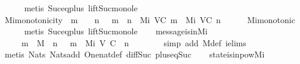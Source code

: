 \begin{isabellebody}
\ \ \ \ \isamarkupfalse%
\ {\isacharparenleft}metis\ Suc{\isacharunderscore}eq{\isacharunderscore}plus{}\ lift{\isacharunderscore}Suc{\isacharunderscore}mono{\isacharunderscore}le{\isacharparenright}%
\endisatagproof
{\isafoldproof}%
%
\isadelimproof
\isanewline
%
\endisadelimproof
\isanewline
\ \ \isamarkupfalse%
\ Mi{\isacharunderscore}monotonicity{\isacharcolon}\ {\isachardoublequoteopen}{\isasymforall}\ m\ {\isasymin}\ {\isasymnat}{\isachardot}\ {\isasymforall}\ n\ {\isasymin}\ {\isasymnat}{\isachardot}\ m\ {\isasymle}\ n\ {\isasymlongrightarrow}\ Mi\ {\isacharparenleft}V{\isacharcomma}C{\isacharcomma}{\isasymepsilon}{\isacharparenright}\ m\ {\isasymsubseteq}\ Mi\ {\isacharparenleft}V{\isacharcomma}C{\isacharcomma}{\isasymepsilon}{\isacharparenright}\ n{\isachardoublequoteclose}\isanewline
%
\isadelimproof
\ \ \ \ %
\endisadelimproof
%
\isatagproof
{}\isamarkupfalse%
\ Mi{\isacharunderscore}monotonic\isanewline
\ \ \ \ \isamarkupfalse%
\ {\isacharparenleft}metis\ Suc{\isacharunderscore}eq{\isacharunderscore}plus{}\ lift{\isacharunderscore}Suc{\isacharunderscore}mono{\isacharunderscore}le{\isacharparenright}%
\endisatagproof
{\isafoldproof}%
%
\isadelimproof
\isanewline
%
\endisadelimproof
\isanewline
\ \ \isamarkupfalse%
\ message{\isacharunderscore}is{\isacharunderscore}in{\isacharunderscore}Mi\ {\isacharcolon}\isanewline
\ \ \ \ {\isachardoublequoteopen}{\isasymforall}\ m\ {\isasymin}\ M{\isachardot}\ {\isasymexists}\ n\ {\isasymin}\ {\isasymnat}{\isachardot}\ m\ {\isasymin}\ Mi\ {\isacharparenleft}V{\isacharcomma}\ C{\isacharcomma}\ {\isasymepsilon}{\isacharparenright}\ {\isacharparenleft}n\ {\isacharminus}\ {}{\isacharparenright}{\isachardoublequoteclose}\isanewline
%
\isadelimproof
\ \ \ \ %
\endisadelimproof
%
\isatagproof
{}\isamarkupfalse%
\ {\isacharparenleft}simp\ add{\isacharcolon}\ M{\isacharunderscore}def\ {\isasymSigma}i{\isachardot}elims{\isacharparenright}\isanewline
\ \ \ \ \isamarkupfalse%
\ {\isacharparenleft}metis\ Nats{\isacharunderscore}{}\ Nats{\isacharunderscore}add\ One{\isacharunderscore}nat{\isacharunderscore}def\ diff{\isacharunderscore}Suc{\isacharunderscore}{}\ plus{\isacharunderscore}{}{\isacharunderscore}eq{\isacharunderscore}Suc{\isacharparenright}%
\endisatagproof
{\isafoldproof}%
%
\isadelimproof
\isanewline
%
\endisadelimproof
\isanewline
\ \ \isamarkupfalse%
\ state{\isacharunderscore}is{\isacharunderscore}in{\isacharunderscore}pow{\isacharunderscore}Mi\ {\isacharcolon}\isanewline

\end{isabellebody}
